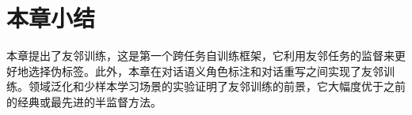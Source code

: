 \newpage
\section{本章小结}\label{sec:fdt_conclusion}
本章提出了友邻训练，这是第一个跨任务自训练框架，它利用友邻任务的监督来更好地选择伪标签。此外，本章在对话语义角色标注和对话重写之间实现了友邻训练。领域泛化和少样本学习场景的实验证明了友邻训练的前景，它大幅度优于之前的经典或最先进的半监督方法。